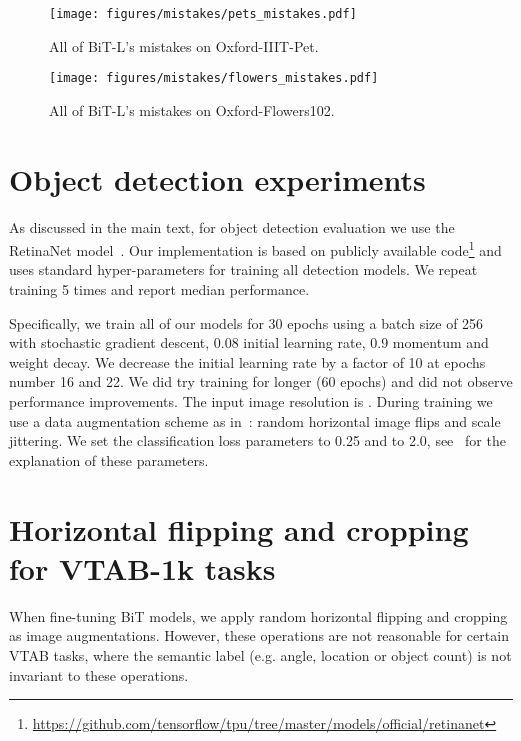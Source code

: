\documentclass[runningheads]{llncs}
\newcommand{\name}{{BiT}}
\begin{document}
\begin{figure}[ht]
\centering
\texttt{[image: figures/mistakes/pets\_mistakes.pdf]}
\caption{All of \name{}-L's mistakes on Oxford-IIIT-Pet.}\label{fig:mistakes-pets}
\end{figure}


\clearpage

\begin{figure}[ht]
\centering
\texttt{[image: figures/mistakes/flowers\_mistakes.pdf]}
\caption{All of \name{}-L's mistakes on Oxford-Flowers102.}\label{fig:mistakes-flowers}
\end{figure}

\section{Object detection experiments}\label{sec:detection-sup}

As discussed in the main text, for object detection evaluation we use the RetinaNet model~\cite{lin2017focal}.
Our implementation is based on publicly available code\footnote{\url{https://github.com/tensorflow/tpu/tree/master/models/official/retinanet}} and uses standard hyper-parameters for training all detection models.
We repeat training 5 times and report median performance. 

Specifically, we train all of our models for 30 epochs using a batch size of 256 with stochastic gradient descent, 0.08 initial learning rate, 0.9 momentum and  weight decay.
We decrease the initial learning rate by a factor of 10 at epochs number 16 and 22.
We did try training for longer (60 epochs) and did not observe performance improvements.
The input image resolution is .
During training we use a data augmentation scheme as in~\cite{lin2014microsoft}: random horizontal image flips and scale jittering.
We set the classification loss parameters  to 0.25 and  to 2.0, see~\cite{lin2017focal} for the explanation of these parameters.

\section{Horizontal flipping and cropping for VTAB-1k tasks}\label{sec:flip-and-crop-details}

When fine-tuning \name{} models, we apply random horizontal flipping and cropping as image augmentations. 
However, these operations are not reasonable for certain VTAB tasks, where the semantic label (e.g. angle, location or object count) is not invariant to these operations.
\end{document}
